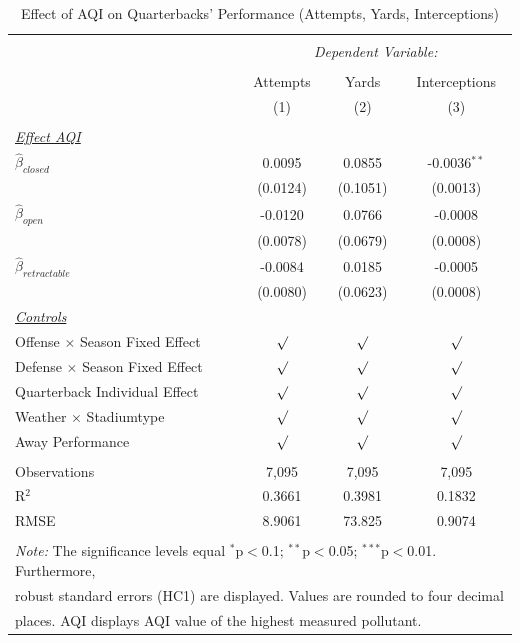 \documentclass[12pt,a4paper]{article}
\begin{document}
{\begin{table}[!htbp] \centering 
  \caption{Effect of AQI on Quarterbacks' Performance (Attempts, Yards, Interceptions)} 
  \label{A:T3} 
\begin{tabular}{@{\extracolsep{5pt}}lccc} 
\hline \\[-1.8ex] 
& \multicolumn{3}{c}{\textit{Dependent Variable:}} \\ \cline{2-4} \\ [-1.8ex]
& Attempts & Yards & Interceptions \\ 
& (1) & (2) & (3)\\ \hline \\[-1.8ex] 
\underline{\textit{Effect AQI}}\\[0.4cm]
$\hat{\beta}_{closed}$& 0.0095 & 0.0855 & -0.0036$^{**}$ \\ 
& (0.0124)  & (0.1051)& (0.0013) \\[0.4cm]
$\hat{\beta}_{open}$& -0.0120 & 0.0766 & -0.0008\\ 
& (0.0078) & (0.0679) & (0.0008) \\[0.4cm]
$\hat{\beta}_{retractable}$& -0.0084 & 0.0185 & -0.0005 \\ 
& (0.0080) & (0.0623) & (0.0008)\\ [0.4cm]
\underline{\textit{Controls}} \\[0.4cm]
Offense $\times$ Season Fixed Effect & $\surd$ & $\surd$ & $\surd$ \\[0.4cm]
Defense $\times$ Season Fixed Effect & $\surd$ & $\surd$  & $\surd$ \\[0.4cm]
Quarterback Individual Effect & $\surd$ & $\surd$ & $\surd$  \\[0.4cm]
Weather $\times $ Stadiumtype & $\surd$ & $\surd$ & $\surd$ \\[0.4cm]
Away Performance & $\surd$ & $\surd$ & $\surd$\\
\hline \\[-1.8ex] 
Observations & 7,095 & 7,095 & 7,095 \\ 
R$^{2}$ & 0.3661 & 0.3981 & 0.1832 \\ 
RMSE & 8.9061 & 73.825 & 0.9074 \\ \hline 
\hline \\[-1.8ex]  
\multicolumn{4}{l}{\footnotesize \textit{Note:} The significance levels equal {$^{*}$p$<$0.1; $^{**}$p$<$0.05; $^{***}$p$<$0.01}.  Furthermore,} \\ \multicolumn{4}{l}{\footnotesize robust standard errors (HC1) are displayed. Values are rounded to four decimal} \\ \multicolumn{4}{l}{\footnotesize places. AQI displays AQI value of the highest measured pollutant.}

\end{tabular}
\end{table}}
\end{document}
